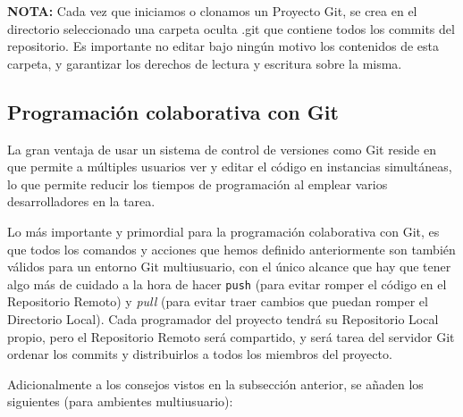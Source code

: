 \documentclass{article}
\begin{document}
\noindent \textbf{NOTA:} Cada vez que iniciamos o clonamos un Proyecto Git, se crea en el directorio seleccionado una carpeta oculta \textsf{.git} que contiene todos los commits del repositorio. Es importante no editar bajo ningún motivo los contenidos de esta carpeta, y garantizar los derechos de lectura y escritura sobre la misma.

\pagebreak

\subsection{Programación colaborativa con Git}

La gran ventaja de usar un sistema de control de versiones como Git reside en que permite a múltiples usuarios ver y editar el código en instancias simultáneas, lo que permite reducir los tiempos de programación al emplear varios desarrolladores en la tarea.

Lo más importante y primordial para la programación colaborativa con Git, es que todos los comandos y acciones que hemos definido anteriormente son también válidos para un entorno Git multiusuario, con el único alcance que hay que tener algo más de cuidado a la hora de hacer \texttt{push} (para evitar romper el código en el Repositorio Remoto) y \textit{pull} (para evitar traer cambios que puedan romper el Directorio Local). Cada programador del proyecto tendrá su Repositorio Local propio, pero el Repositorio Remoto será compartido, y será tarea del servidor Git ordenar los commits y distribuirlos a todos los miembros del proyecto.

Adicionalmente a los consejos vistos en la subsección anterior, se añaden los siguientes (para ambientes multiusuario):
\end{document}
